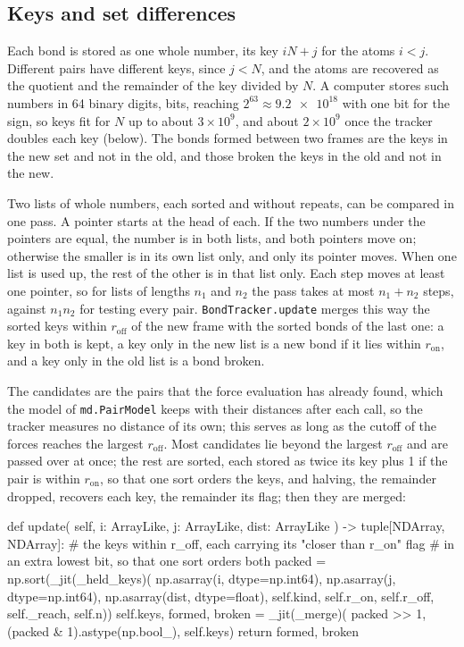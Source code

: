 \subsection*{Keys and set differences}

Each bond is stored as one whole number, its key $iN + j$ for the
atoms $i < j$. Different pairs have different keys, since $j < N$, and
the atoms are recovered as the quotient and the remainder of the key
divided by $N$. A computer stores such numbers in 64 binary digits, bits,
reaching $2^{63} \approx \num{9.2e18}$ with one bit for the sign, so keys
fit for $N$ up to about $3\times10^9$, and about $2\times10^9$ once the
tracker doubles each key (below). The
bonds formed between two frames are the keys in the new set and not in
the old, and those broken the keys in the old and not in the new.

\begin{toolbox}
Two lists of whole numbers, each sorted and without repeats, can be
compared in one pass. A pointer starts at the head of each. If the two
numbers under the pointers are equal, the number is in both lists, and
both pointers move on; otherwise the smaller is in its own list only,
and only its pointer moves. When one list is used up, the rest of the
other is in that list only. Each step moves at least one pointer, so for
lists of lengths $n_1$ and $n_2$ the pass takes at most $n_1 + n_2$
steps, against $n_1n_2$ for testing every pair. \texttt{BondTracker.update} merges this way
the sorted keys within $r_{\mathrm{off}}$ of the new frame with the
sorted bonds of the last one: a key in both is kept, a key only in the new
list is a new bond if it lies within $r_{\mathrm{on}}$, and a key only in
the old list is a bond broken.
\end{toolbox}

The candidates are the pairs that the force evaluation has already
found, which the model of \texttt{md.PairModel} keeps with their
distances after each call, so the tracker measures no distance of its
own; this serves as long as the cutoff of the forces reaches the largest
$r_{\mathrm{off}}$. Most candidates lie beyond the largest
$r_{\mathrm{off}}$ and are passed over at once; the rest are sorted, each
stored as twice its key plus 1 if the pair is within $r_{\mathrm{on}}$, so
that one sort orders the keys, and halving, the remainder dropped,
recovers each key, the remainder its flag; then they are merged:

\begin{code}
    def update(
        self, i: ArrayLike, j: ArrayLike, dist: ArrayLike
    ) -> tuple[NDArray, NDArray]:
        # the keys within r_off, each carrying its "closer than r_on" flag
        # in an extra lowest bit, so that one sort orders both
        packed = np.sort(_jit(_held_keys)(
            np.asarray(i, dtype=np.int64), np.asarray(j, dtype=np.int64),
            np.asarray(dist, dtype=float), self.kind, self.r_on, self.r_off,
            self._reach, self.n))
        self.keys, formed, broken = _jit(_merge)(
            packed >> 1, (packed & 1).astype(np.bool_), self.keys)
        return formed, broken
\end{code}


